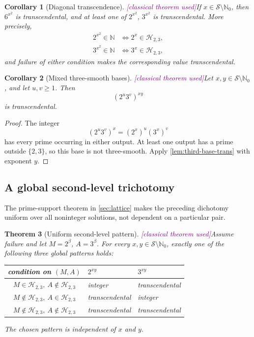 \documentclass[11pt,oneside]{article}
\newtheorem{theorem}{Theorem}[section]
\newtheorem{corollary}[theorem]{Corollary}
\theoremstyle{definition}
\newcommand{\N}{\mathbb N}
\newcommand{\Nzero}{\mathbb N_0}
\newcommand{\Sol}{\mathcal S}
\newcommand{\Smooth}{\mathcal H_{2,3}}
\newcommand{\tagClassical}{\textcolor{Purple}{\textsf{[classical theorem used]}}}
\begin{document}
\begin{corollary}[Diagonal transcendence]\label{cor:diagonal-trans}
\tagClassical If \(x\in\Sol\setminus\Nzero\), then \(6^{x^2}\) is transcendental,
and at least one of \(2^{x^2}\), \(3^{x^2}\) is transcendental.  More precisely,
\[
\begin{aligned}
  2^{x^2}\in\N &\Longleftrightarrow 2^x\in\Smooth,\\
  3^{x^2}\in\N &\Longleftrightarrow 3^x\in\Smooth,
\end{aligned}
\]
and failure of either condition makes the corresponding value transcendental.
\end{corollary}

\begin{corollary}[Mixed three-smooth bases]\label{cor:mixed-base-trans}
\tagClassical Let \(x,y\in\Sol\setminus\Nzero\), and let \(u,v\ge1\).  Then
\[
  (2^u3^v)^{xy}
\]
is transcendental.
\end{corollary}

\begin{proof}
The integer
\[
  (2^u3^v)^x=(2^x)^u(3^x)^v
\]
has every prime occurring in either output.  At least one output has a prime outside
\(\{2,3\}\), so this base is not three-smooth.  Apply
\cref{lem:third-base-trans} with exponent \(y\).
\end{proof}

\subsection{A global second-level trichotomy}

The prime-support theorem in \cref{sec:lattice} makes the preceding dichotomy uniform over
all noninteger solutions, not dependent on a particular pair.

\begin{theorem}[Uniform second-level pattern]\label{thm:uniform-second-level}
\tagClassical Assume failure and let \(M=2^\beta\), \(A=3^\beta\).  For every
\(x,y\in\Sol\setminus\Nzero\), exactly one of the following three global patterns holds:
\begin{center}
\begin{tabularx}{0.94\textwidth}{@{}cYY@{}}
\toprule
condition on \((M,A)\) & \(2^{xy}\) & \(3^{xy}\)\\
\midrule
\(M\in\Smooth,\ A\notin\Smooth\) & integer & transcendental\\
\(M\notin\Smooth,\ A\in\Smooth\) & transcendental & integer\\
\(M\notin\Smooth,\ A\notin\Smooth\) & transcendental & transcendental\\
\bottomrule
\end{tabularx}
\end{center}
The chosen pattern is independent of \(x\) and \(y\).
\end{theorem}
\end{document}
